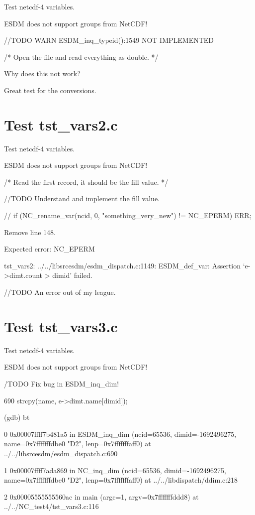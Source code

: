 Test netcdf-4 variables.

ESDM does not support groups from NetCDF!

//TODO WARN ESDM\_inq\_typeid():1549 NOT IMPLEMENTED

/* Open the file and read everything as double. */

Why does this not work?

Great test for the conversions.

\section{Test tst\_vars2.c}

Test netcdf-4 variables.

ESDM does not support groups from NetCDF!

/* Read the first record, it should be the fill value. */

//TODO Understand and implement the fill value.

// if (NC\_rename\_var(ncid, 0, "something\_very\_new") != NC\_EPERM) ERR;

Remove line 148.

Expected error: NC\_EPERM

tst\_vars2: ../../libsrcesdm/esdm\_dispatch.c:1149: ESDM\_def\_var: Assertion `e->dimt.count > dimid' failed.

//TODO An error out of my league.

\section{Test tst\_vars3.c}

Test netcdf-4 variables.

ESDM does not support groups from NetCDF!

/TODO Fix bug in ESDM\_inq\_dim!

690	    strcpy(name, e->dimt.name[dimid]);

(gdb) bt

0  0x00007ffff7b481a5 in ESDM\_inq\_dim (ncid=65536, dimid=-1692496275, name=0x7fffffffdbe0 "D2", lenp=0x7fffffffaff0) at ../../libsrcesdm/esdm\_dispatch.c:690

1  0x00007ffff7ada869 in NC\_inq\_dim (ncid=65536, dimid=-1692496275, name=0x7fffffffdbe0 "D2", lenp=0x7fffffffaff0) at ../../libdispatch/ddim.c:218

2  0x00005555555560ac in main (argc=1, argv=0x7fffffffddd8) at ../../NC\_test4/tst\_vars3.c:116

